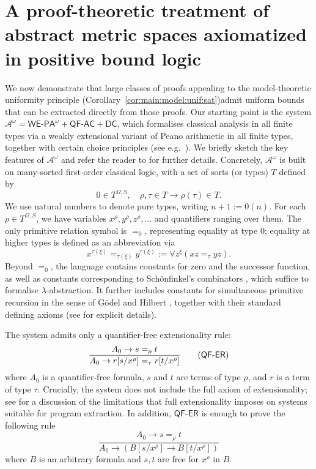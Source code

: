 \documentclass[11pt]{amsart}
\theoremstyle{definition}
\theoremstyle{remark}
\newcommand{\WEPAomega}{\textsf{WE}\mbox{-}\textsf{PA}^\omega}
\newcommand{\QFAC}{\textsf{QF}\mbox{-}\textsf{AC}}
\newcommand{\QFER}{\textsf{QF}\mbox{-}\textsf{ER}}
\newcommand{\DC}{\textsf{DC}}
\begin{document}
\section{A proof-theoretic treatment of abstract metric spaces axiomatized in positive bound logic}
\label{sec:pt}
We now demonstrate that large classes of proofs appealing to the
model-theoretic uniformity principle (Corollary~\ref{cor:main:model:unif:sat})admit uniform bounds that can be extracted directly from those proofs. Our starting point is the system $\mathcal{A}^\omega = \WEPAomega + \QFAC +
\DC$, which formalises classical analysis in all finite types via a weakly
extensional variant of Peano arithmetic in all finite types, together with
certain choice principles (see e.g.\ \cite{kohlenbach2005some}). We briefly
sketch the key features of $\mathcal{A}^\omega$ and refer the reader to
\cite{Kohlenbach2008} for further details. Concretely, $\mathcal{A}^\omega$ is built on many-sorted first-order classical
logic, with a set of sorts (or types) $T$ defined by
\[
  0 \in T^{\Omega,S}, \quad \rho, \tau \in T \rightarrow \rho(\tau) \in T.
\]
We use natural numbers to denote pure types, writing $n+1:=0(n)$. For each
$\rho \in T^{\Omega,S}$, we have variables $x^\rho, y^\rho, z^\rho, \dots$ and
quantifiers ranging over them. The only primitive relation symbol is $=_0$,
representing equality at type $0$; equality at higher types is defined as an
abbreviation via
\[
  x^{\tau(\xi)} =_{\tau(\xi)} y^{\tau(\xi)} := \forall z^\xi \left( xz =_\tau yz \right).
\]
Beyond $=_0$, the language contains constants for zero and the successor
function, as well as constants corresponding to Sch\"onfinkel's combinators
\cite{Schoenfinkel1924}, which suffice to formalise $\lambda$-abstraction. It
further includes constants for simultaneous primitive recursion in the sense of
G\"odel \cite{Goe1958} and Hilbert \cite{Hil1926}, together with their
standard defining axioms (see \cite{Kohlenbach2008} for explicit details).

The system admits only a quantifier-free extensionality rule:
\[
  \frac{A_0 \to s =_\rho t}{A_0 \to r[s/x^\rho] =_\tau r[t/x^\rho]}
  \tag{$\QFER$}
\]
where $A_0$ is a quantifier-free formula, $s$ and $t$ are terms of type $\rho$,
and $r$ is a term of type $\tau$. Crucially, the system does not include the
full axiom of extensionality; see \cite{Kohlenbach2008} for a discussion of the
limitations that full extensionality imposes on systems suitable for program
extraction. In addition, $\QFER$ is enough to prove the following rule
\[
  \frac{A_0 \to s =_\rho t}{A_0 \to (B[s/x^\rho] \to B[t/x^\rho])}
\]
where $B$ is an arbitrary formula and $s,t$ are free for $x^\rho$ in $B$.
\end{document}
